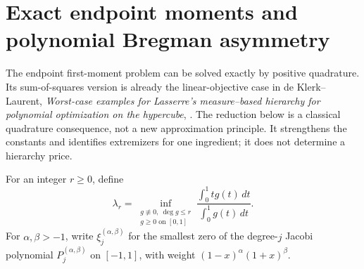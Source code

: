 \section{Exact endpoint moments and polynomial Bregman asymmetry}
\label{sec:p9-exact-asymmetry}

The endpoint first-moment problem can be solved exactly by positive
quadrature. Its sum-of-squares version is already the linear-objective
case in de Klerk--Laurent, \emph{Worst-case examples for Lasserre's
measure--based hierarchy for polynomial optimization on the hypercube},
\cite[Theorem~3.1 and Corollary~3.2]{deklerk}. The reduction below is a
classical quadrature consequence, not a new approximation principle.
It strengthens the constants and identifies extremizers for one ingredient;
it does not determine a hierarchy price.

For an integer $r\ge0$, define
\[
 \lambda_r=\inf_{\substack{g\not\equiv0,\ \deg g\le r\\
                                      g\ge0\text{ on }[0,1]}}
       \frac{\int_0^1 t g(t)\,dt}{\int_0^1g(t)\,dt}.
\]
For $\alpha,\beta>-1$, write $\xi_j^{(\alpha,\beta)}$ for the
smallest zero of the degree-$j$ Jacobi polynomial
$P_j^{(\alpha,\beta)}$ on $[-1,1]$, with weight
$(1-x)^\alpha(1+x)^\beta$.

